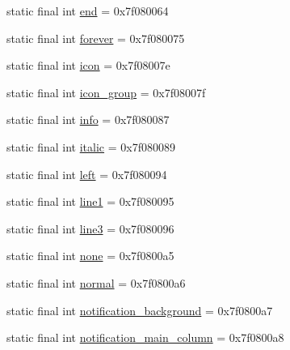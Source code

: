\begin{DoxyCompactItemize}
\item 
static final int \mbox{\hyperlink{classandroid_1_1support_1_1graphics_1_1drawable_1_1animated_1_1_r_1_1id_a97a84c0ccf58430dd3d033e9739ee640}{end}} = 0x7f080064
\item 
static final int \mbox{\hyperlink{classandroid_1_1support_1_1graphics_1_1drawable_1_1animated_1_1_r_1_1id_a7f28a92791f1cb38de1efdc997a07629}{forever}} = 0x7f080075
\item 
static final int \mbox{\hyperlink{classandroid_1_1support_1_1graphics_1_1drawable_1_1animated_1_1_r_1_1id_a77529580b328ea7aef9b76a6fad610d3}{icon}} = 0x7f08007e
\item 
static final int \mbox{\hyperlink{classandroid_1_1support_1_1graphics_1_1drawable_1_1animated_1_1_r_1_1id_a7ae6c60eb608d0fe4c73be06448f5ab1}{icon\+\_\+group}} = 0x7f08007f
\item 
static final int \mbox{\hyperlink{classandroid_1_1support_1_1graphics_1_1drawable_1_1animated_1_1_r_1_1id_ae5aa434b06cb587ead5acd71185c5950}{info}} = 0x7f080087
\item 
static final int \mbox{\hyperlink{classandroid_1_1support_1_1graphics_1_1drawable_1_1animated_1_1_r_1_1id_a4fb8020db5e8977280ad64dabf07c71b}{italic}} = 0x7f080089
\item 
static final int \mbox{\hyperlink{classandroid_1_1support_1_1graphics_1_1drawable_1_1animated_1_1_r_1_1id_ac4c8dce2555f05a360d85ff48fdfb8f3}{left}} = 0x7f080094
\item 
static final int \mbox{\hyperlink{classandroid_1_1support_1_1graphics_1_1drawable_1_1animated_1_1_r_1_1id_afa559e41bf985dcd29a2ad25fcbe59f4}{line1}} = 0x7f080095
\item 
static final int \mbox{\hyperlink{classandroid_1_1support_1_1graphics_1_1drawable_1_1animated_1_1_r_1_1id_a73076872a7ca7bf5ba9b576af783624a}{line3}} = 0x7f080096
\item 
static final int \mbox{\hyperlink{classandroid_1_1support_1_1graphics_1_1drawable_1_1animated_1_1_r_1_1id_a4169fd59588f0075ca0925971795c630}{none}} = 0x7f0800a5
\item 
static final int \mbox{\hyperlink{classandroid_1_1support_1_1graphics_1_1drawable_1_1animated_1_1_r_1_1id_acb92b999f9407163a809f311a58cf233}{normal}} = 0x7f0800a6
\item 
static final int \mbox{\hyperlink{classandroid_1_1support_1_1graphics_1_1drawable_1_1animated_1_1_r_1_1id_a996550cf9174057204f5bdd064f2ec4b}{notification\+\_\+background}} = 0x7f0800a7
\item 
static final int \mbox{\hyperlink{classandroid_1_1support_1_1graphics_1_1drawable_1_1animated_1_1_r_1_1id_a33bd9475d425820a04e7cd8b3959dc41}{notification\+\_\+main\+\_\+column}} = 0x7f0800a8

\end{DoxyCompactItemize}
